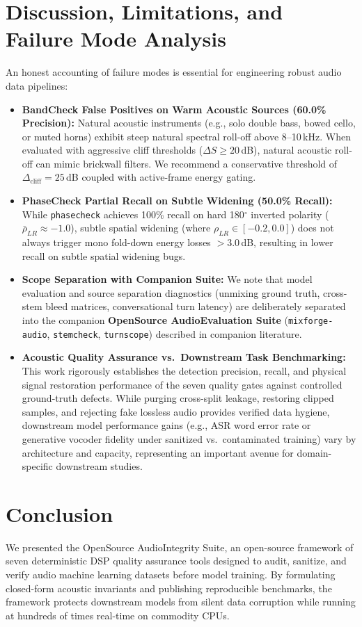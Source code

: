 \documentclass[10pt,journal,compsoc]{IEEEtran}
\begin{document}
\section{Discussion, Limitations, and Failure Mode Analysis}
An honest accounting of failure modes is essential for engineering robust audio data pipelines:
\begin{itemize}
    \item \textbf{BandCheck False Positives on Warm Acoustic Sources (60.0\% Precision):} Natural acoustic instruments (e.g., solo double bass, bowed cello, or muted horns) exhibit steep natural spectral roll-off above 8--10\,kHz. When evaluated with aggressive cliff thresholds ($\Delta S \ge 20$\,dB), natural acoustic roll-off can mimic brickwall filters. We recommend a conservative threshold of $\Delta_{\text{cliff}} = 25$\,dB coupled with active-frame energy gating.
    \item \textbf{PhaseCheck Partial Recall on Subtle Widening (50.0\% Recall):} While \texttt{phasecheck} achieves 100\% recall on hard 180$^\circ$ inverted polarity ($\bar{\rho}_{LR} \approx -1.0$), subtle spatial widening (where $\rho_{LR} \in [-0.2, 0.0]$) does not always trigger mono fold-down energy losses $>3.0$\,dB, resulting in lower recall on subtle spatial widening bugs.
    \item \textbf{Scope Separation with Companion Suite:} We note that model evaluation and source separation diagnostics (unmixing ground truth, cross-stem bleed matrices, conversational turn latency) are deliberately separated into the companion \textbf{OpenSource AudioEvaluation Suite} (\texttt{mixforge-audio}, \texttt{stemcheck}, \texttt{turnscope}) described in companion literature.
    \item \textbf{Acoustic Quality Assurance vs.\ Downstream Task Benchmarking:} This work rigorously establishes the detection precision, recall, and physical signal restoration performance of the seven quality gates against controlled ground-truth defects. While purging cross-split leakage, restoring clipped samples, and rejecting fake lossless audio provides verified data hygiene, downstream model performance gains (e.g., ASR word error rate or generative vocoder fidelity under sanitized vs.\ contaminated training) vary by architecture and capacity, representing an important avenue for domain-specific downstream studies.
\end{itemize}

\newpage
\section{Conclusion}
We presented the OpenSource AudioIntegrity Suite, an open-source framework of seven deterministic DSP quality assurance tools designed to audit, sanitize, and verify audio machine learning datasets before model training. By formulating closed-form acoustic invariants and publishing reproducible benchmarks, the framework protects downstream models from silent data corruption while running at hundreds of times real-time on commodity CPUs.
\end{document}
